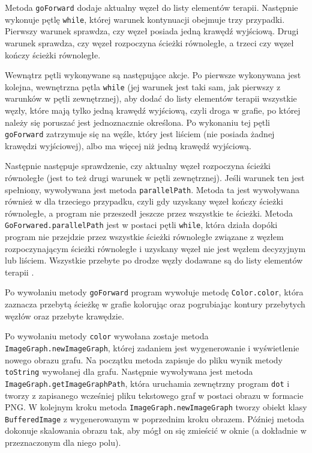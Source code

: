 Metoda \texttt{goForward} dodaje aktualny węzeł do listy elementów terapii. Następnie wykonuje pętlę \texttt{while}, której warunek kontynuacji obejmuje trzy przypadki. Pierwszy warunek sprawdza, czy węzeł posiada jedną krawędź wyjściową. Drugi warunek sprawdza, czy węzeł rozpoczyna ścieżki równoległe, a trzeci czy węzeł kończy ścieżki równoległe. 

Wewnątrz pętli wykonywane są następujące akcje. Po pierwsze wykonywana jest kolejna, wewnętrzna pętla \texttt{while} (jej warunek jest taki sam, jak pierwszy z warunków w pętli zewnętrznej), aby dodać do listy elementów terapii wszystkie węzły, które mają tylko jedną krawędź wyjściową, czyli droga w grafie, po której należy się poruszać jest jednoznacznie określona. Po wykonaniu tej pętli \texttt{goForward} zatrzymuje się na węźle, który jest liściem (nie posiada żadnej krawędzi wyjściowej), albo ma więcej niż jedną krawędź wyjściową.

Następnie następuje sprawdzenie, czy aktualny węzeł rozpoczyna ścieżki równoległe (jest to też drugi warunek w pętli zewnętrznej). Jeśli warunek ten jest spełniony, wywoływana jest metoda \texttt{parallel\-Path}. Metoda ta jest wywoływana również w dla trzeciego przypadku, czyli gdy uzyskany węzeł kończy ścieżki równoległe, a program nie przeszedł jeszcze przez wszystkie te ścieżki. Metoda \texttt{GoForwared.parallel\-Path} jest w postaci pętli \texttt{while}, która działa dopóki program nie przejdzie przez wszystkie ścieżki równoległe związane z węzłem rozpoczynającym ścieżki równoległe i uzyskany węzeł 
nie jest węzłem decyzyjnym lub liściem. Wszystkie przebyte po drodze węzły dodawane są do listy elementów terapii .  

Po wywołaniu metody \texttt{goForward} program wywołuje metodę \texttt{Color.color}, która zaznacza przebytą ścieżkę w grafie kolorując oraz pogrubiając kontury przebytych węzłów oraz przebyte krawędzie.
 
Po wywołaniu metody \texttt{color} wywołana zostaje metoda \texttt{ImageGraph.newImageGraph}, której zadaniem jest wygenerowanie i wyświetlenie nowego obrazu grafu. Na początku metoda zapisuje do pliku wynik metody \texttt{toString} wywołanej dla grafu. Następnie wywoływana jest metoda \texttt{ImageGraph.getImageGraphPath}, która uruchamia zewnętrzny program \texttt{dot} i tworzy z zapisanego wcześniej pliku tekstowego graf w postaci obrazu w formacie PNG. W kolejnym kroku metoda \texttt{ImageGraph.newImageGraph} tworzy obiekt klasy \texttt{BufferedImage} z wygenerowanym w poprzednim kroku obrazem. Później metoda dokonuje skalowania obrazu tak, aby mógł on się zmieścić w oknie (a dokładnie w przeznaczonym dla niego polu). 

